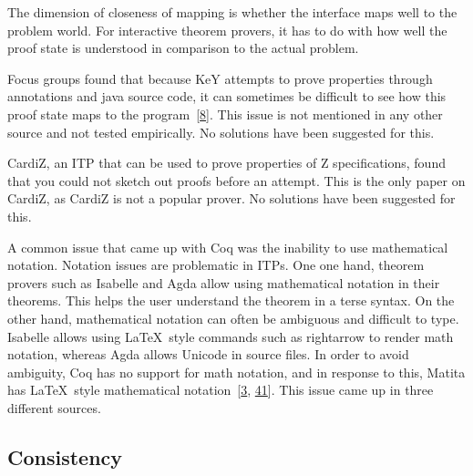 \documentclass[
]{article}
\begin{document}
The dimension of closeness of mapping is whether the interface maps well
to the problem world. For interactive theorem provers, it has to do with
how well the proof state is understood in comparison to the actual
problem.

Focus groups found that because KeY attempts to prove properties through
annotations and java source code, it can sometimes be difficult to see
how this proof state maps to the
program~{[}\protect\hyperlink{ref-beckert_usability_2015}{8}{]}. This
issue is not mentioned in any other source and not tested empirically.
No solutions have been suggested for this.

CardiZ, an ITP that can be used to prove properties of Z specifications,
found that you could not sketch out proofs before an attempt. This is
the only paper on CardiZ, as CardiZ is not a popular prover. No
solutions have been suggested for this.

A common issue that came up with Coq was the inability to use
mathematical notation. Notation issues are problematic in ITPs. One one
hand, theorem provers such as Isabelle and Agda allow using mathematical
notation in their theorems. This helps the user understand the theorem
in a terse syntax. On the other hand, mathematical notation can often be
ambiguous and difficult to type. Isabelle allows using LaTeX~style
commands such as rightarrow to render math notation, whereas Agda allows
Unicode in source files. In order to avoid ambiguity, Coq has no support
for math notation, and in response to this, Matita has LaTeX~style
mathematical notation~{[}\protect\hyperlink{ref-asperti_user_2007}{3},
\protect\hyperlink{ref-zacchiroli_user_2007}{41}{]}. This issue came up
in three different sources.

\hypertarget{consistency-1}{%
\subsection{Consistency}\label{consistency-1}}
\end{document}
